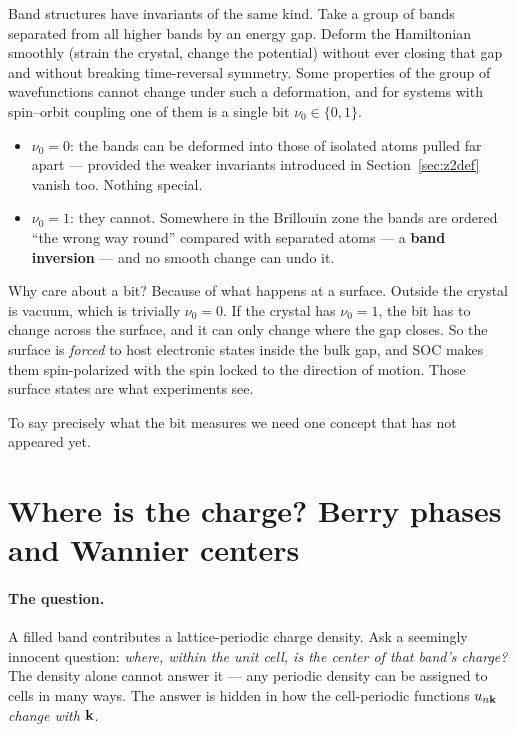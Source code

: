 Band structures have invariants of the same kind. Take a group of bands
separated from all higher bands by an energy gap. Deform the Hamiltonian
smoothly (strain the crystal, change the potential) without ever closing
that gap and without breaking time-reversal symmetry. Some properties of
the group of wavefunctions cannot change under such a deformation, and for
systems with spin--orbit coupling one of them is a single bit
$\nu_0 \in \{0, 1\}$.
\begin{itemize}[leftmargin=2em]
\item $\nu_0 = 0$: the bands can be deformed into those of isolated atoms
pulled far apart --- provided the weaker invariants introduced in
Section~\ref{sec:z2def} vanish too. Nothing special.
\item $\nu_0 = 1$: they cannot. Somewhere in the Brillouin zone the bands
are ordered ``the wrong way round'' compared with separated atoms --- a
\textbf{band inversion} --- and no smooth change can undo it.
\end{itemize}
Why care about a bit? Because of what happens at a surface. Outside the
crystal is vacuum, which is trivially $\nu_0 = 0$. If the crystal has
$\nu_0 = 1$, the bit has to change across the surface, and it can only
change where the gap closes. So the surface is \emph{forced} to host
electronic states inside the bulk gap, and SOC makes them spin-polarized
with the spin locked to the direction of motion. Those surface states are
what experiments see.

To say precisely what the bit measures we need one concept that has not
appeared yet.

\section{Where is the charge? Berry phases and Wannier centers}
\label{sec:berry}

\paragraph{The question.} A filled band contributes a lattice-periodic
charge density. Ask a seemingly innocent question: \emph{where, within the
unit cell, is the center of that band's charge?} The density alone cannot
answer it --- any periodic density can be assigned to cells in many ways.
The answer is hidden in how the cell-periodic functions $u_{n\mathbf{k}}$
\emph{change with} $\mathbf{k}$.

